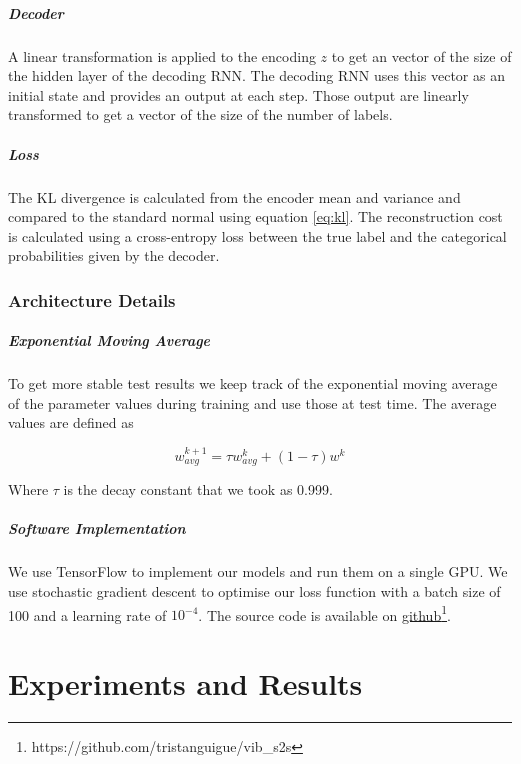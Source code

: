 \documentclass[11pt,oneside,openright]{report}
\begin{document}
\paragraph{Decoder}
A linear transformation is applied to the encoding $z$  to get an vector of the size of the hidden layer of the decoding RNN. The decoding RNN uses this vector as an initial state and provides an output at each step. Those output are linearly transformed to get a vector of the size of the number of labels. 

\paragraph{Loss}
The KL divergence is calculated from the encoder mean and variance and compared to the standard normal using equation \ref{eq:kl}. The reconstruction cost is calculated using a cross-entropy loss between the true label and the categorical probabilities given by the decoder.

\subsection{Architecture Details }
\paragraph{Exponential Moving Average}
To get more stable test results we keep track of the exponential moving average of the parameter values during training and use those at test time. The average values are defined as

$$w_{avg}^{k+1} = \tau w_{avg}^k  + (1 - \tau) w^k$$

Where $\tau$ is the decay constant that we took as 0.999.

\paragraph{Software Implementation}
We use TensorFlow to implement our models and run them on a single GPU. We use stochastic gradient descent to optimise our loss function with a batch size of 100 and a learning rate of $10^{-4}$. The source code is available on \href{https://github.com/tristanguigue/vib_s2s}{github}\footnote{https://github.com/tristanguigue/vib\_s2s}.

\chapter{Experiments and Results}
\end{document}
